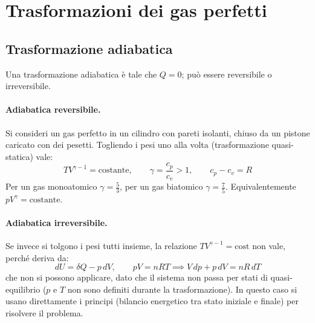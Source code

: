 \documentclass[11pt, a4paper, openright]{book}
\theoremstyle{plain}
\theoremstyle{definition}
\theoremstyle{remark}
\begin{document}
\section{Trasformazioni dei gas perfetti}
\subsection{Trasformazione adiabatica}
Una trasformazione adiabatica è tale che $Q = 0$; può essere reversibile o irreversibile.

\paragraph{Adiabatica reversibile.} Si consideri un gas perfetto in un cilindro con pareti isolanti, chiuso da un pistone caricato con dei pesetti. Togliendo i pesi uno alla volta (trasformazione quasi-statica) vale:
\begin{equation}
    TV^{\gamma - 1} = \text{costante}, \qquad \gamma = \frac{c_p}{c_v} > 1, \qquad c_p - c_v = R
\end{equation}
Per un gas monoatomico $\gamma = \frac{5}{3}$, per un gas biatomico $\gamma = \frac{7}{5}$. Equivalentemente $pV^\gamma = \text{costante}$.

\paragraph{Adiabatica irreversibile.} Se invece si tolgono i pesi tutti insieme, la relazione $TV^{\gamma - 1} = \text{cost}$ non vale, perché deriva da:
\begin{equation}
    dU = \delta Q - p\, dV, \qquad pV = nRT \implies V\,dp + p\,dV = nR\,dT
\end{equation}
che non si possono applicare, dato che il sistema non passa per stati di quasi-equilibrio ($p$ e $T$ non sono definiti durante la trasformazione). In questo caso si usano direttamente i principi (bilancio energetico tra stato iniziale e finale) per risolvere il problema.
\end{document}
